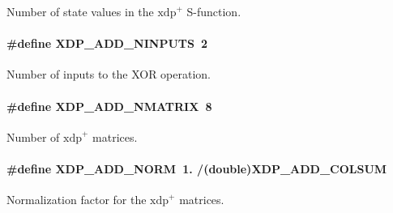 \-Number of state values in the $\mathrm{xdp}^{+}$ \-S-\/function. \hypertarget{xdp-add_8hh_af4d73b89293ebb40f772556f29b9898b}{
\paragraph[{\-X\-D\-P\-\_\-\-A\-D\-D\-\_\-\-N\-I\-N\-P\-U\-T\-S}]{\setlength{\rightskip}{0pt plus 5cm}\#define {\bf \-X\-D\-P\-\_\-\-A\-D\-D\-\_\-\-N\-I\-N\-P\-U\-T\-S}~2}}\label{xdp-add_8hh_af4d73b89293ebb40f772556f29b9898b}
\-Number of inputs to the \-X\-O\-R operation. \hypertarget{xdp-add_8hh_a96b4b847e9c43d0a440192f1a8667225}{
\paragraph[{\-X\-D\-P\-\_\-\-A\-D\-D\-\_\-\-N\-M\-A\-T\-R\-I\-X}]{\setlength{\rightskip}{0pt plus 5cm}\#define {\bf \-X\-D\-P\-\_\-\-A\-D\-D\-\_\-\-N\-M\-A\-T\-R\-I\-X}~8}}\label{xdp-add_8hh_a96b4b847e9c43d0a440192f1a8667225}
\-Number of $\mathrm{xdp}^{+}$ matrices. \hypertarget{xdp-add_8hh_a00dca40fce3b5ac8e3e751e1399f691d}{
\paragraph[{\-X\-D\-P\-\_\-\-A\-D\-D\-\_\-\-N\-O\-R\-M}]{\setlength{\rightskip}{0pt plus 5cm}\#define {\bf \-X\-D\-P\-\_\-\-A\-D\-D\-\_\-\-N\-O\-R\-M}~1. /(double){\bf \-X\-D\-P\-\_\-\-A\-D\-D\-\_\-\-C\-O\-L\-S\-U\-M}}}\label{xdp-add_8hh_a00dca40fce3b5ac8e3e751e1399f691d}
\-Normalization factor for the $\mathrm{xdp}^{+}$ matrices. 

